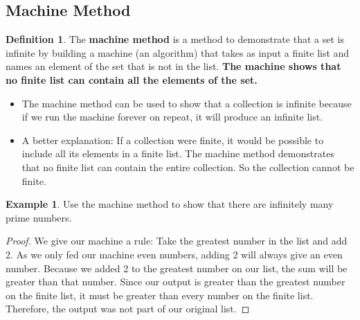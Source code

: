 \documentclass[article, 12pt]{article}
\theoremstyle{definition}
\newtheorem{example}{Example}[subsection]
\newtheorem{definition}{Definition}[subsection]
\begin{document}
    \subsection{Machine Method}
    \begin{definition}
        The \textbf{machine method} is a method to demonstrate that a set is infinite by building a machine (an algorithm) that takes as input a finite list and names an element of the set that is not in the list. \textbf{The machine shows that no finite list can contain all the elements of the set.}

    \end{definition}
    \begin{itemize}
        \item The machine method can be used to show that a collection is infinite because if we run the machine forever on repeat, it will produce an infinite list.
        \item A better explanation: If a collection were finite, it would be possible to include all its elements in a finite list. The machine method demonstrates that no finite list can contain the entire collection. So the collection cannot be finite.
    \end{itemize}
    \begin{example}
        Use the machine method to show that there are infinitely many prime numbers.
        \begin{proof}
            We give our machine a rule: Take the greatest number in the list and add 2. As we only fed our machine even numbers, adding 2 will always give an even number. Because we added 2 to the greatest number on our list, the sum will be greater than that number. Since our output is greater than the greatest number on the finite list, it must be greater than every number on the finite list. Therefore, the output was not part of our original list.
        \end{proof}
    \end{example}
\end{document}
